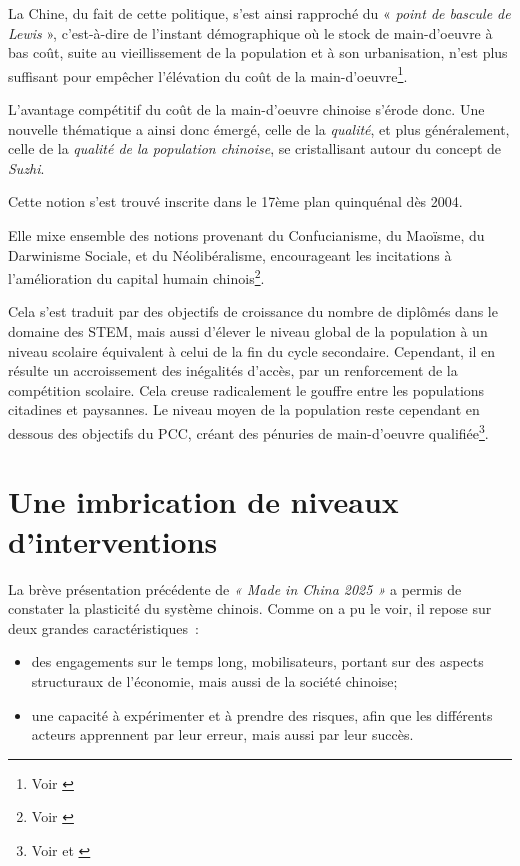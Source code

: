 \documentclass[a4paper]{article}
\begin{document}
La Chine, du fait de cette politique, s’est ainsi rapproché du « \textit{point de bascule de Lewis} », c’est-à-dire de l’instant démographique où le stock de main-d’oeuvre à bas coût, suite au vieillissement de la population et à son urbanisation, n’est plus suffisant pour empêcher l’élévation du coût de la main-d’oeuvre\footnote{Voir \cite{dollar20_china}}.

L’avantage compétitif du coût de la main-d’oeuvre chinoise s’érode donc. Une nouvelle thématique a ainsi donc émergé, celle de la \textit{qualité}, et plus généralement, celle de la \textit{qualité de la population chinoise}, se cristallisant autour du concept de \textit{Suzhi}.

Cette notion s’est trouvé inscrite dans le 17ème plan quinquénal dès 2004. 

Elle mixe ensemble des notions provenant du Confucianisme, du Maoïsme, du Darwinisme Sociale, et du Néolibéralisme, encourageant les incitations à l’amélioration du capital humain chinois\footnote{Voir \cite{greenhalgh10_cultiv}}.

Cela s’est traduit par des objectifs de croissance du nombre de diplômés dans le domaine des STEM, mais aussi d’élever le niveau global de la population à un niveau scolaire équivalent à celui de la fin du cycle secondaire. Cependant, il en résulte un accroissement des inégalités d’accès, par un renforcement de la compétition scolaire. Cela creuse radicalement le gouffre entre les populations citadines et paysannes. Le niveau moyen de la population reste cependant en dessous des objectifs du PCC, créant des pénuries de main-d’oeuvre qualifiée\footnote{Voir \cite{simon09_chinas} et \cite{xiaolan15_chinas}}.


\section{Une imbrication de niveaux d’interventions}
\label{sec:org0a2f1cf}
La brève présentation précédente de \textit{« Made in China 2025 »} a permis de constater la plasticité du système chinois. Comme on a pu le voir, il repose sur deux grandes caractéristiques~:

\begin{itemize}
\item des engagements sur le temps long, mobilisateurs, portant sur des aspects structuraux de l’économie, mais aussi de la société chinoise;
\item une capacité à expérimenter et à prendre des risques, afin que les différents acteurs apprennent par leur erreur, mais aussi par leur succès.
\end{itemize}
\end{document}
